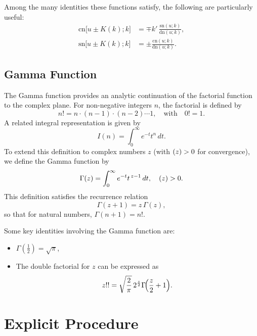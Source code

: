 \documentclass[12pt,oneside]{report}
\theoremstyle{definition}
\let\Re\relax
\DeclareMathOperator{\Re}{Re}
\begin{document}
Among the many identities these functions satisfy, the following are particularly useful:
\begin{subequations}\label{eq:jacobi_identities}
\begin{align}
\text{cn}\bigl[u \pm K(k); k\bigr] &= \mp k'\,\frac{\text{sn}(u; k)}{\text{dn}(u; k)}, \label{Jacobi cn} \\
\text{sn}\bigl[u \pm K(k); k\bigr] &= \pm\frac{\text{cn}(u; k)}{\text{dn}(u; k)}. \label{Jacobi sn}
\end{align}
\end{subequations}

\section{Gamma Function}
The Gamma function provides an analytic continuation of the factorial function to the complex plane. For non-negative integers \(n\), the factorial is defined by
\[
n! = n \cdot (n-1) \cdot (n-2) \cdots 1, \quad \text{with} \quad 0! = 1.
\]
A related integral representation is given by
\[
I(n) = \int_{0}^{\infty} e^{-t} t^{n} \, dt.
\]
To extend this definition to complex numbers \(z\) (with \(\Re(z)>0\) for convergence), we define the Gamma function by
\[
\Gamma(z) = \int_{0}^{\infty} e^{-t}t^{\,z-1}\,dt, \quad \Re(z)>0.
\]
This definition satisfies the recurrence relation
\[
\Gamma(z+1) = z\,\Gamma(z),
\]
so that for natural numbers, \(\Gamma(n+1) = n!\).

Some key identities involving the Gamma function are:
\begin{itemize}
    \item \(\Gamma\!\left(\frac{1}{2}\right) = \sqrt{\pi}\),
    \item The double factorial for \(z\) can be expressed as
    \[
    z!! = \sqrt{\frac{2}{\pi}}\,2^{\frac{z}{2}}\Gamma\!\Bigl(\frac{z}{2}+1\Bigr).
    \]
\end{itemize}
\chapter{Explicit Procedure}\label{Ganalysis}
\end{document}
